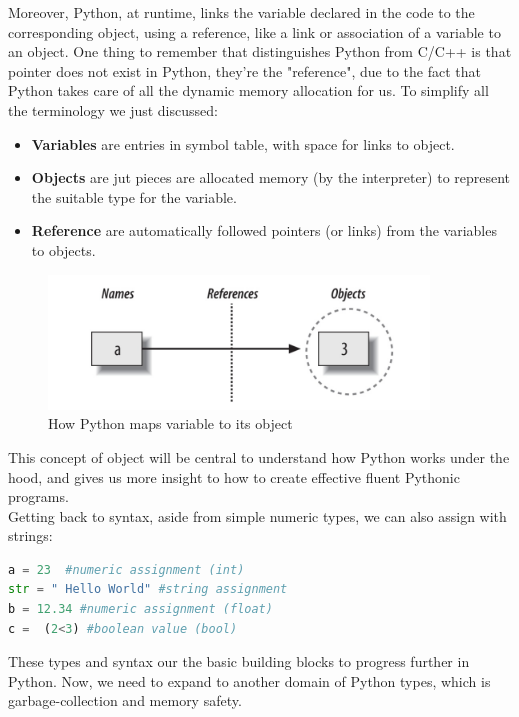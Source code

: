 \documentclass[twoside,final]{hcmut-report}
\begin{document}
\hspace*{6.5mm} Moreover, Python, at runtime, links the variable declared in the code to the corresponding object, using a reference, like a link or association of a variable to an object. One thing to remember that distinguishes Python from C/C++ is that pointer does not exist in Python, they're the "reference", due to the fact that Python takes care of all the dynamic memory allocation for us. To simplify all the terminology we just discussed:
\begin{itemize}
\item \textbf{Variables} are entries in symbol table, with space for links to object.
\item \textbf{Objects} are jut pieces are allocated memory (by the interpreter) to represent the suitable type for the variable.
\item \textbf{Reference} are automatically followed pointers (or links) from the variables to objects.
\end{itemize}
\begin{figure}[ht]
\centering
\includegraphics[width=0.9\textwidth]{graphics/python3}
\caption{How Python maps variable to its object}
\end{figure}
\hspace*{6.5mm} This concept of object will be central to understand how Python works under the hood, and gives us more insight to how to create effective fluent Pythonic programs.\\
\hspace*{6.5mm} Getting back to syntax, aside from simple numeric types, we can also assign with strings: 


\begin{lstlisting}[language=Python, caption=A Few Examples of Assignment in Python]
a = 23 	#numeric assignment (int)
str = " Hello World" #string assignment
b = 12.34 #numeric assignment (float)
c =  (2<3) #boolean value (bool)
\end{lstlisting}
\hspace*{6.5mm} These types and syntax our the basic building blocks to progress further in Python. Now, we need to expand to another domain of Python types, which is garbage-collection and memory safety.
\end{document}
